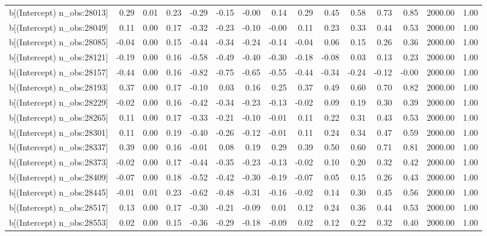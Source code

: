 \begin{table}[ht]
\begin{tabular}{rrrrrrrrrrrrrrr}
  b[(Intercept) n\_obs:28013] & 0.29 & 0.01 & 0.23 & -0.29 & -0.15 & -0.00 & 0.14 & 0.29 & 0.45 & 0.58 & 0.73 & 0.85 & 2000.00 & 1.00 \\ 
  b[(Intercept) n\_obs:28049] & 0.11 & 0.00 & 0.17 & -0.32 & -0.23 & -0.10 & -0.00 & 0.11 & 0.23 & 0.33 & 0.44 & 0.53 & 2000.00 & 1.00 \\ 
  b[(Intercept) n\_obs:28085] & -0.04 & 0.00 & 0.15 & -0.44 & -0.34 & -0.24 & -0.14 & -0.04 & 0.06 & 0.15 & 0.26 & 0.36 & 2000.00 & 1.00 \\ 
  b[(Intercept) n\_obs:28121] & -0.19 & 0.00 & 0.16 & -0.58 & -0.49 & -0.40 & -0.30 & -0.18 & -0.08 & 0.03 & 0.13 & 0.23 & 2000.00 & 1.00 \\ 
  b[(Intercept) n\_obs:28157] & -0.44 & 0.00 & 0.16 & -0.82 & -0.75 & -0.65 & -0.55 & -0.44 & -0.34 & -0.24 & -0.12 & -0.00 & 2000.00 & 1.00 \\ 
  b[(Intercept) n\_obs:28193] & 0.37 & 0.00 & 0.17 & -0.10 & 0.03 & 0.16 & 0.25 & 0.37 & 0.49 & 0.60 & 0.70 & 0.82 & 2000.00 & 1.00 \\ 
  b[(Intercept) n\_obs:28229] & -0.02 & 0.00 & 0.16 & -0.42 & -0.34 & -0.23 & -0.13 & -0.02 & 0.09 & 0.19 & 0.30 & 0.39 & 2000.00 & 1.00 \\ 
  b[(Intercept) n\_obs:28265] & 0.11 & 0.00 & 0.17 & -0.33 & -0.21 & -0.10 & -0.01 & 0.11 & 0.22 & 0.31 & 0.43 & 0.53 & 2000.00 & 1.00 \\ 
  b[(Intercept) n\_obs:28301] & 0.11 & 0.00 & 0.19 & -0.40 & -0.26 & -0.12 & -0.01 & 0.11 & 0.24 & 0.34 & 0.47 & 0.59 & 2000.00 & 1.00 \\ 
  b[(Intercept) n\_obs:28337] & 0.39 & 0.00 & 0.16 & -0.01 & 0.08 & 0.19 & 0.29 & 0.39 & 0.50 & 0.60 & 0.71 & 0.81 & 2000.00 & 1.00 \\ 
  b[(Intercept) n\_obs:28373] & -0.02 & 0.00 & 0.17 & -0.44 & -0.35 & -0.23 & -0.13 & -0.02 & 0.10 & 0.20 & 0.32 & 0.42 & 2000.00 & 1.00 \\ 
  b[(Intercept) n\_obs:28409] & -0.07 & 0.00 & 0.18 & -0.52 & -0.42 & -0.30 & -0.19 & -0.07 & 0.05 & 0.15 & 0.26 & 0.43 & 2000.00 & 1.00 \\ 
  b[(Intercept) n\_obs:28445] & -0.01 & 0.01 & 0.23 & -0.62 & -0.48 & -0.31 & -0.16 & -0.02 & 0.14 & 0.30 & 0.45 & 0.56 & 2000.00 & 1.00 \\ 
  b[(Intercept) n\_obs:28517] & 0.13 & 0.00 & 0.17 & -0.30 & -0.21 & -0.09 & 0.01 & 0.12 & 0.24 & 0.36 & 0.44 & 0.53 & 2000.00 & 1.00 \\ 
  b[(Intercept) n\_obs:28553] & 0.02 & 0.00 & 0.15 & -0.36 & -0.29 & -0.18 & -0.09 & 0.02 & 0.12 & 0.22 & 0.32 & 0.40 & 2000.00 & 1.00 \\ 

\end{tabular}
\end{table}
